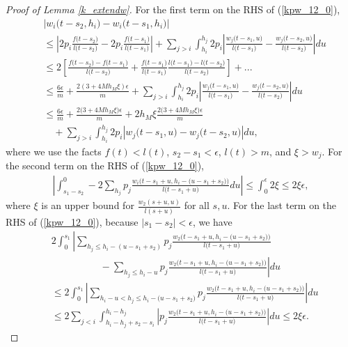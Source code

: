 \documentclass[12pt]{article}
\numberwithin{equation}{section}  %
\begin{document}
\begin{proof}[Proof of Lemma \ref{k_extendw}]
For the first term on the RHS of (\ref{kpw_12_0}),
\begin{align}
&\left|w_i\big(t-s_2,h_i\big)- w_i\big(t-s_1,h_i\big)\right|\nonumber\\
&\leq\left|2p_i\frac{f\big(t-s_2\big)}{l\big(t-s_2\big)}-2p_i\frac{f\big(t-s_1\big)}{l\big(t-s_1\big)}\right|
+\sum_{j>i}\int_{ h_i}^{h_j}2p_i
\left|
\frac{w_j\big(t-s_1,u\big)}{l\big(t-s_1\big)}-\frac{w_j\big(t-s_2,u\big)}{l\big(t-s_2\big)}
\right| du
\nonumber\\
&\leq2\left[\frac{f\big(t-s_2\big)-f\big(t-s_1\big)}{l\big(t-s_2\big)}+\frac{f\big(t-s_1\big)}{l\big(t-s_1\big)}\frac{l\big(t-s_1\big)-l\big(t-s_2\big)}{l\big(t-s_2\big)}\right]+..\nonumber.\\
&\leq \frac{6\epsilon}{m}+\frac{2(3+4M h_M \xi)\epsilon}{m}
+\sum_{j>i}\int_{ h_i}^{h_j}2p_i
\left|
\frac{w_j\big(t-s_1,u\big)}{l\big(t-s_1\big)}-\frac{w_j\big(t-s_2,u\big)}{l\big(t-s_2\big)}
\right| du\nonumber\\
&\leq\frac{6\epsilon}{m}+\frac{2\big(3+4M h_M \xi\big)\epsilon}{m}+2h_M\xi \frac{2\big(3+4M h_M\xi\big)\epsilon}{m}\nonumber\\
&\quad+\sum_{j>i}\int_{ h_i}^{h_j}2p_i
\left|
w_j\big(t-s_1,u\big)-w_j\big(t-s_2,u\big)
\right|
du\label{kpw_12_1},
\end{align}
where we use the facts $f(t)<l(t)$, $s_2-s_1<\epsilon$, $l(t)>m$, and $\xi>w_j$. For the second term on the RHS of (\ref{kpw_12_0}),
\begin{align}
\left|\int_{s_1-s_2}^0-2 \sum_{h_j}p_j \frac{w_i\big(t-s_1+u,h_i-\big(u-s_1+s_2\big)\big)}{l\big(t-s_1+u\big)}du\right|\leq\int_{0}^{\epsilon}2\xi
\leq 2\xi\epsilon\label{kpw_12_2},
\end{align}
where $\xi$ is an upper bound for $\frac{w_2(s+u,u)}{l(s+u)}$ for all $s,u$. For the last term on the RHS of (\ref{kpw_12_0}), because $|s_1-s_2|<\epsilon$, we have
{
\begin{align} 
&2\int_{0}^{s_1} 
\left|
\sum_{h_j\leq h_i-(u-s_1+s_2)} p_j\frac{w_2\big(t-s_1+u,h_i-\big(u-s_1+s_2\big)\big)}{l\big(t-s_1+u\big)}\right.\nonumber\\
&\left.\quad\quad\quad\quad\quad
-\sum_{h_j\leq h_i-u} p_j\frac{w_2\big(t-s_1+u,h_i-\big(u-s_1+s_2\big)\big)}{l\big(t-s_1+u\big)} 
\right|
du\nonumber\\
&\leq 2\int_{0}^{s_1} 
\left|
\sum_{h_i-u <h_j\leq h_i-\big(u-s_1+s_2\big)} p_j\frac{w_2\big(t-s_1+u,h_i-\big(u-s_1+s_2\big)\big)}{l\big(t-s_1+u\big)} 
\right| 
du\nonumber\\
&\leq 2\sum_{j<i}\int_{h_i-h_j+s_2-s_i}^{h_i-h_j}
\left|
p_j\frac{w_2\big(t-s_1+u,h_i-\big(u-s_1+s_2\big)\big)}{l\big(t-s_1+u\big)} 
\right| 
du\leq 2 \xi \epsilon \label{kpw_12_4}.
\end{align}}


\end{proof}
\end{document}
